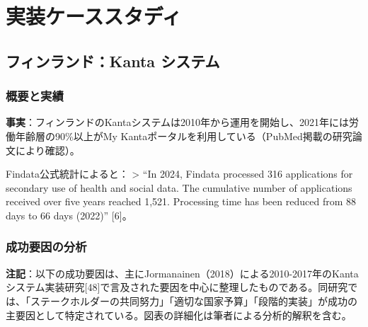 \documentclass[
  a4paper,
  a4paper,
  11pt]{ltjsbook}
\begin{document}
\chapter{実装ケーススタディ}\label{ux5b9fux88c5ux30b1ux30fcux30b9ux30b9ux30bfux30c7ux30a3}

\section{フィンランド：Kanta
システム}\label{ux30d5ux30a3ux30f3ux30e9ux30f3ux30c9kanta-ux30b7ux30b9ux30c6ux30e0}

\subsection{概要と実績}\label{ux6982ux8981ux3068ux5b9fux7e3e}

\textbf{事実}：フィンランドのKantaシステムは2010年から運用を開始し、2021年には労働年齢層の90\%以上がMy
Kantaポータルを利用している（PubMed掲載の研究論文により確認）。

Findata公式統計によると： \textgreater{} ``In 2024, Findata processed
316 applications for secondary use of health and social data. The
cumulative number of applications received over five years reached
1,521. Processing time has been reduced from 88 days to 66 days (2022)''
{[}6{]}。

\subsection{成功要因の分析}\label{ux6210ux529fux8981ux56e0ux306eux5206ux6790}

\begin{tcolorbox}[enhanced jigsaw, toprule=.15mm, bottomtitle=1mm, coltitle=black, left=2mm, opacityback=0, arc=.35mm, colbacktitle=quarto-callout-note-color!10!white, colback=white, opacitybacktitle=0.6, bottomrule=.15mm, rightrule=.15mm, breakable, title=\textcolor{quarto-callout-note-color}{\faInfo}\hspace{0.5em}{Note}, toptitle=1mm, titlerule=0mm, colframe=quarto-callout-note-color-frame, leftrule=.75mm]

\textbf{注記}：以下の成功要因は、主にJormanainen（2018）による2010-2017年のKantaシステム実装研究{[}48{]}で言及された要因を中心に整理したものである。同研究では、「ステークホルダーの共同努力」「適切な国家予算」「段階的実装」が成功の主要因として特定されている。図表の詳細化は筆者による分析的解釈を含む。

\end{tcolorbox}
\end{document}
